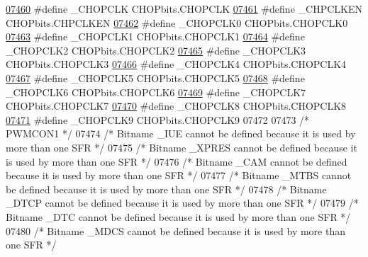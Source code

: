 \begin{DoxyCode}
\hypertarget{a00015_source_l07460}{}\hyperlink{a00015_a4205f5c995280a43b3d94f31b8c36415}{07460} \textcolor{preprocessor}{#define \_CHOPCLK CHOPbits.CHOPCLK}
\hypertarget{a00015_source_l07461}{}\hyperlink{a00015_a997dddeaea698a7b313e3b86a4583d98}{07461} \textcolor{preprocessor}{#define \_CHPCLKEN CHOPbits.CHPCLKEN}
\hypertarget{a00015_source_l07462}{}\hyperlink{a00015_a1280e3bb677b8e7c27cb739196444b75}{07462} \textcolor{preprocessor}{#define \_CHOPCLK0 CHOPbits.CHOPCLK0}
\hypertarget{a00015_source_l07463}{}\hyperlink{a00015_ad569a09248ba6e5cec522bfdc1a406f7}{07463} \textcolor{preprocessor}{#define \_CHOPCLK1 CHOPbits.CHOPCLK1}
\hypertarget{a00015_source_l07464}{}\hyperlink{a00015_ab7a17643f22557f71fb6c665d7720b0e}{07464} \textcolor{preprocessor}{#define \_CHOPCLK2 CHOPbits.CHOPCLK2}
\hypertarget{a00015_source_l07465}{}\hyperlink{a00015_a0d1bd81c21a6984688626b32b919162b}{07465} \textcolor{preprocessor}{#define \_CHOPCLK3 CHOPbits.CHOPCLK3}
\hypertarget{a00015_source_l07466}{}\hyperlink{a00015_a1a39e8b4bb1d01a3f842061d85a9b4b4}{07466} \textcolor{preprocessor}{#define \_CHOPCLK4 CHOPbits.CHOPCLK4}
\hypertarget{a00015_source_l07467}{}\hyperlink{a00015_a688de0cc2d82d352531d224247664873}{07467} \textcolor{preprocessor}{#define \_CHOPCLK5 CHOPbits.CHOPCLK5}
\hypertarget{a00015_source_l07468}{}\hyperlink{a00015_afc4cef605d18f570b746265658e7afa7}{07468} \textcolor{preprocessor}{#define \_CHOPCLK6 CHOPbits.CHOPCLK6}
\hypertarget{a00015_source_l07469}{}\hyperlink{a00015_a762d6e4a9e7f5239f30d4e544aef8fb1}{07469} \textcolor{preprocessor}{#define \_CHOPCLK7 CHOPbits.CHOPCLK7}
\hypertarget{a00015_source_l07470}{}\hyperlink{a00015_a53923da0b57d17586ee8fc6b14820bc1}{07470} \textcolor{preprocessor}{#define \_CHOPCLK8 CHOPbits.CHOPCLK8}
\hypertarget{a00015_source_l07471}{}\hyperlink{a00015_a7a0f719f7dea2b86e554e794b334576a}{07471} \textcolor{preprocessor}{#define \_CHOPCLK9 CHOPbits.CHOPCLK9}
07472 
07473 \textcolor{comment}{/* PWMCON1 */}
07474 \textcolor{comment}{/* Bitname \_IUE cannot be defined because it is used by more than one SFR */}
07475 \textcolor{comment}{/* Bitname \_XPRES cannot be defined because it is used by more than one SFR */}
07476 \textcolor{comment}{/* Bitname \_CAM cannot be defined because it is used by more than one SFR */}
07477 \textcolor{comment}{/* Bitname \_MTBS cannot be defined because it is used by more than one SFR */}
07478 \textcolor{comment}{/* Bitname \_DTCP cannot be defined because it is used by more than one SFR */}
07479 \textcolor{comment}{/* Bitname \_DTC cannot be defined because it is used by more than one SFR */}
07480 \textcolor{comment}{/* Bitname \_MDCS cannot be defined because it is used by more than one SFR */}

\end{DoxyCode}
